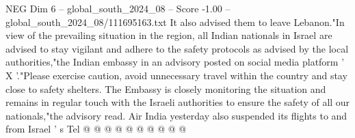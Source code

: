 \begin{textsample}{NEG Dim 6 – global\_south\_2024\_08 – Score -1.00 – global\_south\_2024\_08/111695163.txt}
It also advised them to leave Lebanon."In view of the prevailing situation in the region, all Indian nationals in Israel are advised to stay vigilant and adhere to the safety protocols as advised by the local authorities,"the Indian embassy in an advisory posted on social media platform ' X '."Please exercise caution, avoid unnecessary travel within the country and stay close to safety shelters.
The Embassy is closely monitoring the situation and remains in regular touch with the Israeli authorities to ensure the safety of all our nationals,"the advisory read.
Air India yesterday also suspended its flights to and from Israel ' s Tel @ @ @ @ @ @ @ @ @ @

\end{textsample}
